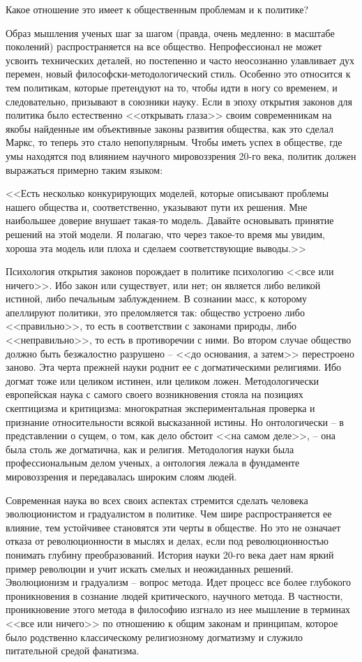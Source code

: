 \documentclass{book}
\begin{document}
Какое отношение это имеет к общественным проблемам и к политике?

Образ мышления ученых шаг за шагом (правда, очень мед­ленно: в масштабе поколений) распространяется на все общест­во. Непрофессионал не может усвоить технических деталей, но постепенно и часто неосознанно улавливает дух перемен, новый философски-методологический стиль. Особенно это относится к тем политикам, которые претендуют на то, чтобы идти в ногу со временем, и следовательно, призывают в союзники науку. Если в эпоху открытия законов для политика было естественно <<открывать глаза>> своим современникам на якобы найден­ные им объективные законы развития общества, как это сделал Маркс, то теперь это стало непопулярным. Чтобы иметь успех в обществе, где умы находятся под влиянием научного мировоззрения 20-го века, политик должен выражаться примерно таким языком:

<<Есть несколько конкурирующих моделей, которые описы­вают проблемы нашего общества и, соответственно, указывают пути их решения. Мне наибольшее доверие внушает такая-то модель. Давайте основывать принятие решений на этой модели. Я полагаю, что через такое-то время мы увидим, хороша эта модель или плоха и сделаем соответствующие выводы.>>

Психология открытия законов порождает в политике психологию <<все или ничего>>. Ибо закон или существует, или нет; он является либо великой истиной, либо печальным заблуждением. В сознании масс, к которому апеллируют политики, это преломляется так: общество устроено либо <<правильно>>, то есть в соответствии с законами природы, либо <<неправильно>>, то есть в противоречии с ними. Во втором случае общество должно быть безжалостно разрушено -- <<до основания, а затем>> перестроено заново. Эта черта прежней науки роднит ее с догматическими религиями. Ибо догмат тоже или целиком истинен, или целиком ложен. Методологически европейская наука с самого своего возникновения стояла на позициях скептицизма и критицизма: многократная экспериментальная проверка и признание относительности всякой высказанной истины. Но онтологически -- в представлении о сущем, о том, как дело обстоит <<на самом деле>>, -- она была столь же догматична, как и религия. Методология науки была профессиональным делом ученых, а онтология лежала в 
фундаменте мировоззрения и пе­редавалась широким слоям людей.

Современная наука во всех своих аспектах стремится сделать человека эволюционистом и градуалистом в политике. Чем шире распространяется ее влияние, тем устойчивее становятся эти черты в обществе. Но это не означает отказа от революционности в мыслях и делах, если под революционностью понимать глубину преобразований. История науки 20-го века дает нам яркий пример революции и учит искать смелых и неожиданных решений. Эволюционизм и градуализм -- вопрос метода. Идет процесс все более глубокого проникновения в сознание людей критического, научного метода. В частности, проникновение этого метода в философию изгнало из нее мышление в терминах <<все или ничего>> по отношению к общим законам и принципам, которое было родственно классическому религиозному догматизму и служило питательной средой фанатизма.
\end{document}
